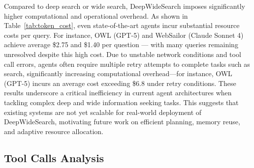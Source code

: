 \documentclass[11pt, letterpaper, logo, onecolumn, copyright, numbering]{paper_improved}
\begin{document}
Compared to deep search or wide search, DeepWideSearch imposes significantly higher computational and operational overhead. 
As shown in Table~\ref{tab:token_cost}, even state-of-the-art agents incur substantial resource costs per query. For instance, OWL (GPT-5) and WebSailor (Claude Sonnet 4) achieve average \$2.75 and \$1.40 per question — with many queries remaining unresolved despite this high cost.
Due to unstable network conditions and tool call errors, agents often require multiple retry attempts to complete tasks such as search, significantly increasing computational overhead—for instance, OWL (GPT-5) incurs an average cost exceeding \$6.8 under retry conditions.
These results underscore a critical inefficiency in current agent architectures when tackling complex deep and wide information seeking tasks. This suggests that existing systems are not yet scalable for real-world deployment of DeepWideSearch, motivating future work on efficient planning, memory reuse, and adaptive resource allocation.


\subsection{Tool Calls Analysis\label{subsec.tool_call_analysis}}


\begin{table}
\vspace{-12pt}
\centering
\caption{Average tool calls in the WebSailor system.}
\label{tab:tool_call}
\end{table}
\end{document}
